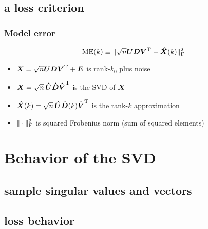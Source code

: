 \documentclass{beamer}
\begin{document}
\subsection{a loss criterion}

\begin{frame}
  \frametitle{Model error}
  \[
    \operatorname*{ME}(k) \equiv \| \sqrt{n} \boldsymbol{U} \boldsymbol{D} \boldsymbol{V}^{\mathrm{T}} - \boldsymbol{\hat X}(k) \|_{\text{F}}^2
  \]
  \begin{itemize}
    \item $\boldsymbol{X} = \sqrt{n} \boldsymbol{U} \boldsymbol{D} \boldsymbol{V}^{\mathrm{T}} + \boldsymbol{E}$ is rank-$k_0$ plus noise
    \item $\boldsymbol{X} = \sqrt{n} \, \boldsymbol{\hat U} \boldsymbol{\hat D} \boldsymbol{\hat V}^{\mathrm{T}}$ is the SVD of $\boldsymbol{X}$
    \item $\boldsymbol{\hat X}(k) = \sqrt{n} \, \boldsymbol{\hat U} \boldsymbol{\hat D}(k) \boldsymbol{\hat V}^{\mathrm{T}}$ is the rank-$k$ approximation
    \item $\| \cdot \|_{\text{F}}^2$ is squared Frobenius norm (sum of squared elements)
  \end{itemize}
\end{frame}


\section{Behavior of the SVD}
\subsection{sample singular values and vectors}
\subsection{loss behavior}
\end{document}
